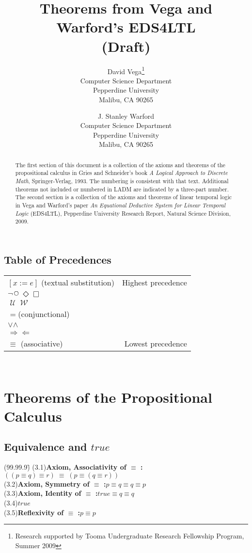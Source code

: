 \documentclass[fleqn, leqno]{article}
\title{Theorems from Vega and Warford's EDS4LTL\\(Draft)}
\author{David Vega\thanks{Research supported by Tooma Undergraduate Research Fellowship Program, Summer 2009}\\
   Computer Science Department\\
   Pepperdine University\\
   Malibu, CA 90265
   \and
   J. Stanley Warford\\
   Computer Science Department\\
   Pepperdine University\\
   Malibu, CA 90265}
\date{} %
\newcommand{\lgap}{2pt}                             %
\newcommand{\llgap}{6pt}                            %
\newcommand{\equivs}{\ensuremath{\;\equiv\;}}       %
\newcommand{\impl}{\ensuremath{\Rightarrow}}        %
\newcommand{\foll}{\ensuremath{\Leftarrow}}         %
\newcommand{\Until}{\;\mathcal{U}\;}
\newcommand{\Wait}{\;\mathcal{W}\;}
\newcommand{\Next}{\;\,\text{\raisebox{3.5pt}{\circle{6}}}}
\newcommand{\Event}{\Diamond}
\newcommand{\Always}{\Box}
\begin{document}
\maketitle

\begin{abstract}
The first section of this document is a collection of the axioms and theorems of the
propositional calculus in Gries and Schneider's
book \textit{A Logical Approach to Discrete Math}, Springer-Verlag, 1993.
The numbering is consistent with that text.
Additional theorems not included or numbered in LADM are indicated by a three-part
number.
The second section is a collection of the axioms and theorems of linear temporal logic
in Vega and Warford's paper \textit{An Equational Deductive System for Linear Temporal Logic}
(EDS4LTL),
Pepperdine University Research Report, Natural Science Division, 2009.
\end{abstract}

\subsection*{Table of Precedences}

\begin{tabular}{lr}
\hline
$[x := e]$ (textual substitution) & Highest precedence\\
$\neg$\quad $\Next$\quad $\Event$\quad $\Always$ &\\
$\Until$\quad $\Wait$ &\\
$=$\quad (conjunctional) &\\
$\lor$\quad $\land$ &\\
$\impl$\quad $\foll$ &\\
$\equiv$ \quad (associative) & Lowest precedence\\
\hline
\end{tabular}\\[\llgap]

\section*{Theorems of the Propositional Calculus}

\subsection*{Equivalence and $true$}
\begin{tabbing}
(99.99.9)\;\=\kill
(3.1)\>\textbf{Axiom, Associativity of $\equiv$ :}\quad $((p\equiv q) \equiv r)\equivs (p\equiv (q\equiv r))$\\[\lgap]
(3.2)\>\textbf{Axiom, Symmetry of $\equiv$ :}\quad $p\equiv q \equiv q\equiv p$\\[\lgap]
(3.3)\>\textbf{Axiom, Identity of $\equiv$ :}\quad $true\equiv q \equiv q$\\[\lgap]
(3.4)\>$true$\\[\lgap]
(3.5)\>\textbf{Reflexivity of $\equiv$ :}\quad $p\equiv p$\\
\end{tabbing}
\end{document}
